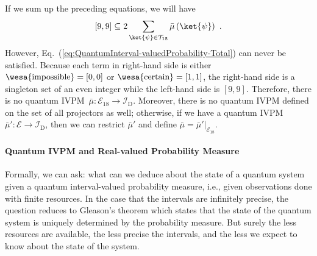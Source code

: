 \documentclass[english,reprint, aps, prl,superscriptaddress, showpacs,
showkeys, longbibliography, amsmath, amssymb]{revtex4-1}
\theoremstyle{plain}
\theoremstyle{definition}
\newcommand{\events}{\ensuremath{\mathcal{E}}}
\newcommand{\imposs}{{\text{\wesa{impossible}}}}
\newcommand{\necess}{{\text{\wesa{certain}}}}
\begin{document}
If we sum up the preceding equations, we will have
\begin{equation}
\left[9,9\right]\subseteq2\sum_{\ket{\psi}\in\mathcal{T}_{18}}\bar{\mu}\left(\ket{\psi}\right)\textrm{ .}\label{eq:QuantumInterval-valuedProbability-Total}
\end{equation}
However, Eq.~(\ref{eq:QuantumInterval-valuedProbability-Total})
can never be satisfied. Because each term in right-hand side is either
$\imposs=\left[0,0\right]$ or $\necess=\left[1,1\right]$, the right-hand
side is a singleton set of an even integer while the left-hand side
is $\left[9,9\right]$. Therefore, there is no quantum IVPM~$\bar{\mu}:\events_{18}\rightarrow\mathscr{I}_{\mathrm{D}}$.
Moreover, there is no quantum IVPM defined on the set of all projectors
as well; otherwise, if we have a quantum IVPM~$\bar{\mu}':\events\rightarrow\mathscr{I}_{\mathrm{D}}$,
then we can restrict $\bar{\mu}'$ and define $\bar{\mu}=\left.\bar{\mu}'\right|_{\events_{18}}$.

\paragraph{Quantum IVPM and Real-valued Probability Measure}

Formally, we can ask: what can we deduce about the state of a quantum
system given a quantum interval-valued probability measure, i.e.,
given observations done with finite resources. In the case that the
intervals are infinitely precise, the question reduces to Gleason's
theorem which states that the state of the quantum system is uniquely
determined by the probability measure. But surely the less resources
are available, the less precise the intervals, and the less we expect
to know about the state of the system.
\end{document}
